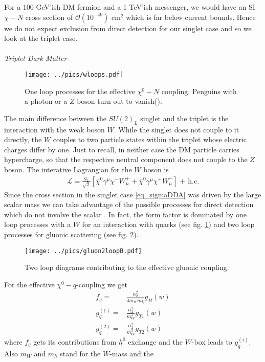 For a 100 GeV'ish DM fermion and a 1 TeV'ish messenger, we would have an SI $\chi-N$ cross section of $\mathcal{O}(10^{-49})$ cm$^2$ which is far 
below current bounds. Hence we do not expect exclusion from direct detection for our singlet case and so we look at the triplet case.
\\ \\ \textit{Triplet Dark Matter}\\
\begin{figure}[t]
 \texttt{[image: ../pics/wloops.pdf]}
 \caption{One loop processes for the effective $\chi^0-N$ coupling. Penguins with a photon or a $Z$-boson turn out to vanish(\cite{1104.0228}).}
 \label{pic_wloop}
\end{figure}
The main difference between the $SU(2)_L$ singlet and the triplet is the interaction with the weak boson $W$. While the singlet does not couple to
it directly, the $W$ couples to two particle states within the triplet whose electric charges differ by one. Just to recall, in neither case the 
DM particle carries hypercharge, so that the respective neutral component does not couple to the $Z$ boson. The interative Lagrangian for the $W$ 
boson is 
\begin{align}
 \mathcal{L} = \frac{g_2}{\sqrt{2}} \left[\bar \chi^0 \gamma^\mu \chi^- W^+_\mu + \bar \chi^0 \gamma^\mu \chi^+W^-_\mu\right] +\, \text{h.c.}
\end{align}
Since the cross section in the singlet case \eqref{eq_sigmaDDA} was driven by the large scalar mass we can take advantage of the possible processes
for direct detection which do not involve the scalar \cite{1004.4090}. In fact, the form factor is dominated by one loop processes with a $W$ for an interaction with
quarks (see fig. \ref{pic_wloop}) and two loop processes for gluonic scattering (see fig. \ref{pic_2loopgluon}).
\begin{figure}[t]
 \texttt{[image: ../pics/gluon2loopB.pdf]}
 \caption{Two loop diagrams contributing to the effective gluonic coupling.}
 \label{pic_2loopgluon}
\end{figure}
For the effective $\chi^0-q$-coupling we get
\begin{align}
 f_q =& \frac{\alpha_2^2}{4m_W m_{h}^2} g_H(w)\\
 g^{(1)}_q =& \frac{\alpha_2^2}{m_W^3}g_{T1}(w)\\
 g^{(2)}_q =&\frac{\alpha_2^2}{m_W^3}g_{T2}(w) 
\end{align}
where $f_q$ gets its contributions from $h^0$ exchange and the $W$-box leads to $g^{(i)}_q$. Also $m_W$ and $m_h$ stand for the $W$-mass and the 
